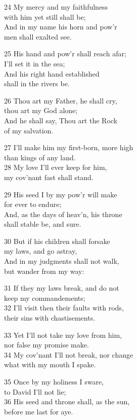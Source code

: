24 My mercy and my faithfulness\\
with him yet still shall be;\\
And in my name his horn and pow’r\\
men shall exalted see.

25 His hand and pow’r shall reach afar;\\
I’ll set it in the sea;\\
And his right hand established\\
shall in the rivers be.

26 Thou art my Father, he shall cry,\\
thou art my God alone;\\
And he shall say, Thou art the Rock\\
of my salvation.

27 I’ll make him my first-born, more high\\
than kings of any land.\\
28 My love I’ll ever keep for him,\\
my cov’nant fast shall stand.

29 His seed I by my pow’r will make\\
for ever to endure;\\
And, as the days of heav’n, his throne\\
shall stable be, and sure.

30 But if his children shall forsake\\
my laws, and go astray,\\
And in my judgments shall not walk,\\
but wander from my way:

31 If they my laws break, and do not\\
keep my commandements;\\
32 I’ll visit then their faults with rods,\\
their sins with chastisements.

33 Yet I’ll not take my love from him,\\
nor false my promise make.\\
34 My cov’nant I’ll not break, nor change\\
what with my mouth I spake.

35 Once by my holiness I sware,\\
to David I’ll not lie;\\
36 His seed and throne shall, as the sun,\\
before me last for aye.

